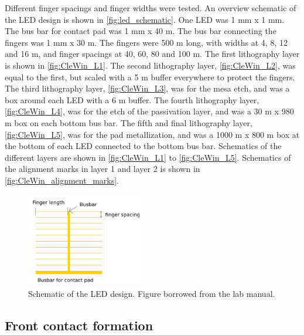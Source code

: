 Different finger spacings and finger widths were tested.
An overview schematic of the LED design is shown in \autoref{fig:led_schematic}.
One LED was 1 mm x 1 mm.
The bus bar for contact pad was 1 mm x 40 \textmu m.
The bus bar connecting the fingers was 1 mm x 30 \textmu m.
The fingers were 500 \textmu m long, with widths at 4, 8, 12 and 16 \textmu m, and finger spacings at 40, 60, 80 and 100 \textmu m.
The first lithography layer is shown in \autoref{fig:CleWin_L1}.
The second lithography layer, \autoref{fig:CleWin_L2}, was equal to the first, but scaled with a 5 \textmu m buffer everywhere to protect the fingers. 
The third lithography layer, \autoref{fig:CleWin_L3}, was for the mesa etch, and was a box around each LED with a 6 \textmu m buffer. 
The fourth lithography layer, \autoref{fig:CleWin_L4}, was for the etch of the passivation layer, and was a 30 \textmu m x 980 \textmu m box on each bottom bus bar. 
The fifth and final lithography layer, \autoref{fig:CleWin_L5}, was for the pad metallization, and was a 1000 \textmu m x 800 \textmu m box at the bottom of each LED connected to the bottom bus bar.
Schematics of the different layers are shown in \autoref{fig:CleWin_L1} to \autoref{fig:CleWin_L5}.
Schematics of the alignment marks in layer 1 and layer 2 is shown in \autoref{fig:CleWin_alignment_marks}.

\begin{figure}[ht]
    \centering
    \includegraphics[width=0.45\textwidth]{figures/LED_schematic.jpg}
    \caption{
        Schematic of the LED design.
        Figure borrowed from the lab manual.
    }
    \label{fig:led_schematic}
\end{figure}





\subsection{Front contact formation}
\label{methods:front_contact}

